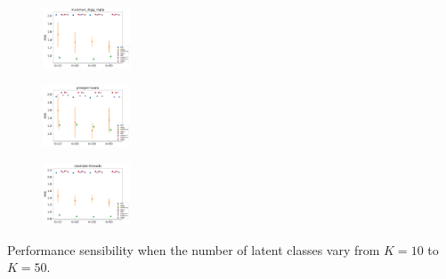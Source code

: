 \begin{subfigure}
         \centering
      \includegraphics[width=0.23\textwidth]{fig2/digg-reply_wsim3_evo2__}
\end{subfigure} 
\begin{subfigure}
         \centering
      \includegraphics[width=0.23\textwidth]{fig2/prosper-loans_wsim3_evo2__}
\end{subfigure} 
\begin{subfigure}
         \centering
      \includegraphics[width=0.23\textwidth]{fig2/slashdot_wsim3_evo2__}
\end{subfigure} 
\caption{Performance sensibility when the number of latent classes vary from $K=10$ to $K=50$.}

